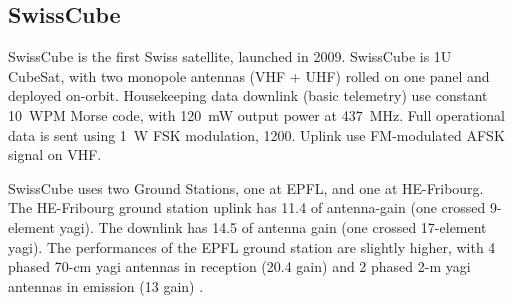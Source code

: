 \subsection{SwissCube}
SwissCube is the first Swiss satellite, launched in 2009. SwissCube is 1U CubeSat, with two monopole antennas (VHF + UHF) rolled on one panel and deployed on-orbit. Housekeeping data downlink (basic telemetry) use constant \si{10}~WPM Morse code, with \SI{120}{\milli\watt} output power at \SI{437}{\MHz}. Full operational data is sent using \SI{1}{\watt} FSK modulation, \SI{1200}{\bps}. Uplink use FM-modulated AFSK signal on VHF. 

SwissCube uses two Ground Stations, one at EPFL, and one at HE-Fribourg. The HE-Fribourg ground station uplink has \SI{11.4}{\dBi} of antenna-gain (one crossed \si{9}-element yagi). The downlink has \SI{14.5}{\dBi} of antenna gain (one crossed \si{17}-element yagi). The performances of the EPFL ground station are slightly higher, with \si{4} phased \si{70}-cm yagi antennas in reception (\SI{20.4}{\dBi} gain) and \si{2} phased \si{2}-m yagi antennas in emission (\SI{13}{\dBi} gain) \cite{swisscube_groundstation}.

